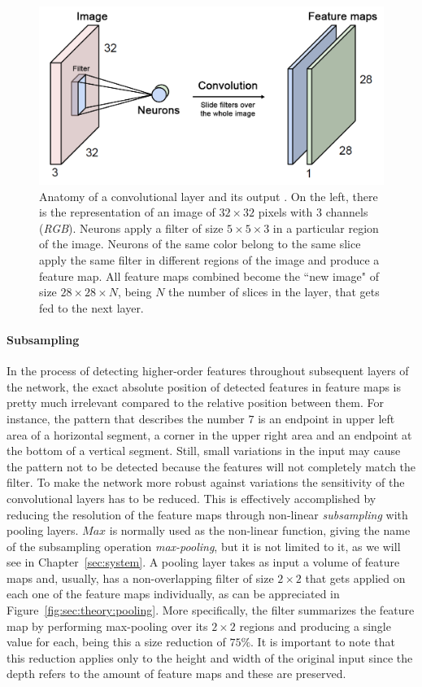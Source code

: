 \begin{figure}[htb]
  \includegraphics[width=\textwidth]{gfx/conv-layer-2}
  \caption{Anatomy of a convolutional layer and its output \cite{Guerzhoy2016}.
    On the left, there is the representation of an image of ${32}\times{32}$ pixels with $3$ channels (\emph{RGB}).
    Neurons apply a filter of size ${5}\times{5}\times{3}$ in a particular region of the image.
    Neurons of the same color belong to the same slice apply the same filter in different regions of the image and produce a feature map.
    All feature maps combined become the ``new image" of size ${28}\times{28}\times{N}$, being $N$ the number of slices in the layer, that gets fed to the next layer.}
  \label{fig:sec:theory:conv-layer-2}
\end{figure}

\paragraph{Subsampling}
In the process of detecting higher-order features throughout subsequent layers of the network, the exact absolute position of detected features in feature maps is pretty much irrelevant compared to the relative position between them.
For instance, the pattern that describes the number $7$ is an endpoint in upper left area of a horizontal segment, a corner in the upper right area and an endpoint at the bottom of a vertical segment.
Still, small variations in the input may cause the pattern not to be detected because the features will not completely match the filter.
To make the network more robust against variations the sensitivity of the convolutional layers has to be reduced.
This is effectively accomplished by reducing the resolution of the feature maps through non-linear \emph{subsampling} with pooling layers.
$Max$ is normally used as the non-linear function, giving the name of the subsampling operation \emph{max-pooling}, but it is not limited to it, as we will see in Chapter~\ref{sec:system}.
A pooling layer takes as input a volume of feature maps and, usually, has a non-overlapping filter of size ${2}\times{2}$ that gets applied on each one of the feature maps individually, as can be appreciated in Figure~\ref{fig:sec:theory:pooling}.
More specifically, the filter summarizes the feature map by performing max-pooling over its ${2}\times{2}$ regions and producing a single value for each, being this a size reduction of $75\%$.
It is important to note that this reduction applies only to the height and width of the original input since the depth refers to the amount of feature maps and these are preserved.

